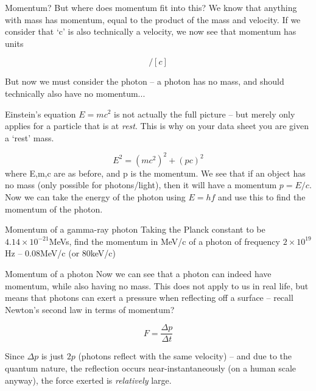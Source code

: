 \documentclass[../Main.tex]{subfiles}
\begin{document}
\begin{frame}{Momentum?}
    But where does momentum fit into this? \newline \newline
    We know that anything with mass has momentum, equal to the product of the mass and velocity. If we consider that `c' is also technically a velocity, we now see that momentum has units

    \begin{equation*}
        [MeV]/[c]
    \end{equation*} %

    But now we must consider the photon -- a photon has no mass, and should technically also have no momentum...
\end{frame}

\begin{frame}{Einstein's equation}
    $E=mc^2$ is not actually the full picture -- but merely only applies for a particle that is at \emph{rest}. This is why on your data sheet you are given a `rest' mass. %

    \begin{equation*}
        E^2 = (mc^2)^2+(pc)^2
    \end{equation*}
    where E,m,c are as before, and p is the momentum. %
    \newline \newline
    We see that if an object has no mass (only possible for photons/light), then it will have a momentum $p=E/c$.
    \newline \newline
Now we can take the energy of the photon using $E=hf$ and use this to find the momentum of the photon.
\begin{exampleblock}{Momentum of a gamma-ray photon}
    Taking the Planck constant to be $4.14\times 10^{-21}$MeVs, find the momentum in MeV/c of a photon of frequency $2\times 10^{19}$Hz %
    -- 0.08MeV/c (or 80keV/c)
\end{exampleblock}
\end{frame}

\begin{frame}{Momentum of a photon}
    Now we can see that a photon can indeed have momentum, while also having no mass. This does not apply to us in real life, but means that photons can exert a pressure when reflecting off a surface -- recall Newton's second law in terms of momentum? %

    \begin{equation*}
        F=\frac{\Delta p}{\Delta t}
    \end{equation*}

    Since $\Delta p$ is just $2p$ (photons reflect with the same velocity) -- and due to the quantum nature, the reflection occurs near-instantaneously (on a human scale anyway), the force exerted is \emph{relatively} large. 
\end{frame}
\end{document}
